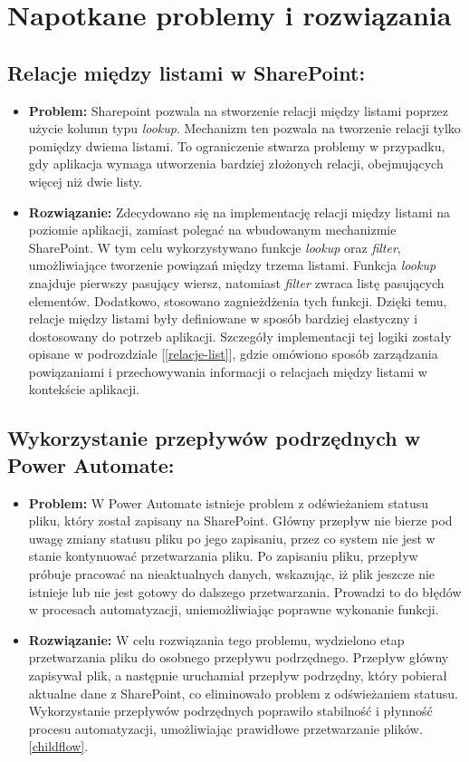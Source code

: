 \chapter{Napotkane problemy i rozwiązania}


\section*{Relacje między listami w SharePoint:}
\begin{itemize}
      \item \textbf{Problem:}
            Sharepoint pozwala na stworzenie relacji między listami poprzez użycie kolumn typu \emph{lookup}. Mechanizm ten pozwala na tworzenie relacji tylko pomiędzy dwiema listami. To ograniczenie stwarza problemy w przypadku, gdy aplikacja wymaga utworzenia bardziej złożonych relacji, obejmujących więcej niż dwie listy.
      \item \textbf{Rozwiązanie:} Zdecydowano się na implementację relacji między listami na poziomie aplikacji, zamiast polegać na wbudowanym mechanizmie SharePoint. W tym celu wykorzystywano funkcje \emph{lookup} oraz \emph{filter}, umożliwiające tworzenie powiązań między trzema listami. Funkcja \emph{lookup} znajduje pierwszy pasujący wiersz, natomiast \emph{filter} zwraca listę pasujących elementów. Dodatkowo, stosowano zagnieżdżenia tych funkcji. Dzięki temu, relacje między listami były definiowane w sposób bardziej elastyczny i dostosowany do potrzeb aplikacji. Szczegóły implementacji tej logiki zostały opisane w podrozdziale [\ref{relacje-list}], gdzie omówiono sposób zarządzania powiązaniami i przechowywania informacji o relacjach między listami w kontekście aplikacji.
\end{itemize}

\section*{Wykorzystanie przepływów podrzędnych w Power Automate:}
\begin{itemize}
      \item \textbf{Problem:} W Power Automate istnieje problem z odświeżaniem statusu pliku, który został zapisany na SharePoint. Główny przepływ nie bierze pod uwagę zmiany statusu pliku po jego zapisaniu, przez co system nie jest w stanie kontynuować przetwarzania pliku. Po zapisaniu pliku, przepływ próbuje pracować na nieaktualnych danych, wskazując, iż plik jeszcze nie istnieje lub nie jest gotowy do dalszego przetwarzania. Prowadzi to do błędów w procesach automatyzacji, uniemożliwiając poprawne wykonanie funkcji.
      \item \textbf{Rozwiązanie:} W celu rozwiązania tego problemu, wydzielono etap przetwarzania pliku do osobnego przepływu podrzędnego. Przepływ główny zapisywał plik, a następnie uruchamiał przepływ podrzędny, który pobierał aktualne dane z SharePoint, co eliminowało problem z odświeżaniem statusu. Wykorzystanie przepływów podrzędnych poprawiło stabilność i płynność procesu automatyzacji, umożliwiając prawidłowe przetwarzanie plików. \ref{childflow}.
\end{itemize}


